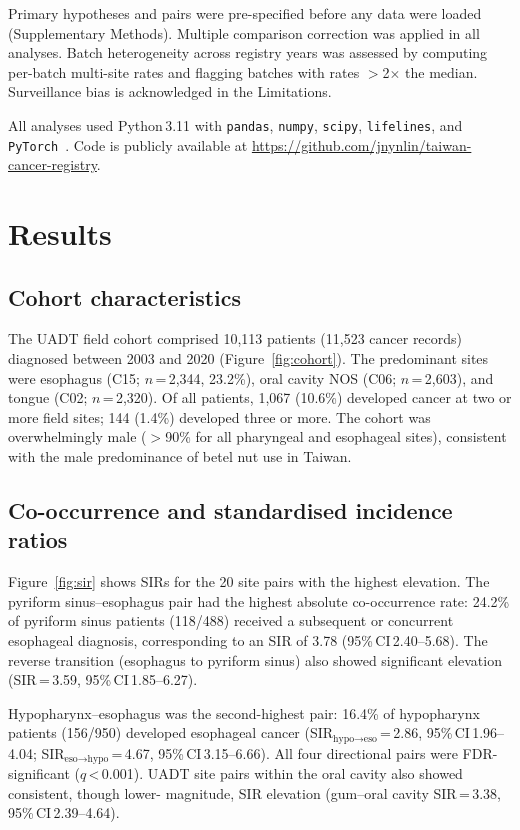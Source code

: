 \documentclass[12pt,a4paper]{article}
\begin{document}
Primary hypotheses and pairs were pre-specified before any data were loaded
(Supplementary Methods). Multiple comparison correction was applied in all
analyses. Batch heterogeneity across registry years was assessed by computing
per-batch multi-site rates and flagging batches with rates $>$2$\times$ the median.
Surveillance bias is acknowledged in the Limitations.

All analyses used Python\,3.11 with \texttt{pandas}, \texttt{numpy},
\texttt{scipy}, \texttt{lifelines}, and \texttt{PyTorch}~\citep{paszke2019}.
Code is publicly available at \url{https://github.com/jnynlin/taiwan-cancer-registry}.

\section{Results}

\subsection{Cohort characteristics}

The UADT field cohort comprised 10,113 patients (11,523 cancer records)
diagnosed between 2003 and 2020 (Figure~\ref{fig:cohort}).
The predominant sites were esophagus (C15; $n$\,=\,2,344, 23.2\%),
oral cavity NOS (C06; $n$\,=\,2,603), and tongue (C02; $n$\,=\,2,320).
Of all patients, 1,067 (10.6\%) developed cancer at two or more field
sites; 144 (1.4\%) developed three or more. The cohort was overwhelmingly
male ($>$90\% for all pharyngeal and esophageal sites), consistent
with the male predominance of betel nut use in Taiwan.

\subsection{Co-occurrence and standardised incidence ratios}

Figure~\ref{fig:sir} shows SIRs for the 20 site pairs with the highest elevation.
The pyriform sinus--esophagus pair had the highest absolute co-occurrence rate:
24.2\% of pyriform sinus patients (118/488) received a subsequent or concurrent
esophageal diagnosis, corresponding to an SIR of 3.78 (95\%\,CI\,2.40--5.68).
The reverse transition (esophagus to pyriform sinus) also showed significant
elevation (SIR\,=\,3.59, 95\%\,CI\,1.85--6.27).

Hypopharynx--esophagus was the second-highest pair:
16.4\% of hypopharynx patients (156/950) developed esophageal cancer
(SIR$_{\text{hypo}\to\text{eso}}$\,=\,2.86, 95\%\,CI\,1.96--4.04;
SIR$_{\text{eso}\to\text{hypo}}$\,=\,4.67, 95\%\,CI\,3.15--6.66).
All four directional pairs were FDR-significant ($q$\,<\,0.001).
UADT site pairs within the oral cavity also showed consistent, though lower-
magnitude, SIR elevation (gum--oral cavity SIR\,=\,3.38, 95\%\,CI\,2.39--4.64).
\end{document}
